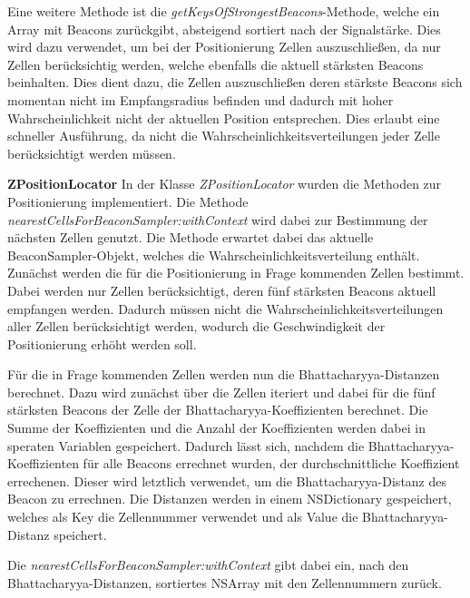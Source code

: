 Eine weitere Methode ist die \emph{getKeysOfStrongestBeacons}-Methode, welche ein Array mit Beacons zurückgibt, absteigend sortiert nach der Signalstärke. Dies wird dazu verwendet, um bei der Positionierung Zellen auszuschließen, da nur Zellen berücksichtig werden, welche ebenfalls die aktuell stärksten Beacons beinhalten. Dies dient dazu, die Zellen auszuschließen deren stärkste Beacons sich momentan nicht im Empfangsradius befinden und dadurch mit hoher Wahrscheinlichkeit nicht der aktuellen Position entsprechen. Dies erlaubt eine schneller Ausführung, da nicht die Wahrscheinlichkeitsverteilungen jeder Zelle berücksichtigt werden müssen.



\textbf{ZPositionLocator}
In der Klasse \emph{ZPositionLocator} wurden die Methoden zur Positionierung implementiert. Die Methode \emph{nearestCellsForBeaconSampler:withContext} wird dabei zur Bestimmung der nächsten Zellen genutzt. 
Die Methode erwartet dabei das aktuelle BeaconSampler-Objekt, welches die Wahrscheinlichkeitsverteilung enthält. 
Zunächst werden die für die Positionierung in Frage kommenden Zellen bestimmt. Dabei werden nur Zellen berücksichtigt, deren fünf stärksten Beacons aktuell empfangen werden. Dadurch müssen nicht die Wahrscheinlichkeitsverteilungen aller Zellen berücksichtigt werden, wodurch die Geschwindigkeit der Positionierung erhöht werden soll.

Für die in Frage kommenden Zellen werden nun die Bhattacharyya-Distanzen berechnet. Dazu wird zunächst über die Zellen iteriert und dabei für die fünf stärksten Beacons der Zelle der Bhattacharyya-Koeffizienten berechnet. Die Summe der Koeffizienten und die Anzahl der Koeffizienten werden dabei in  speraten Variablen gespeichert. Dadurch lässt sich, nachdem die Bhattacharyya-Koeffizienten für alle Beacons errechnet wurden, der durchschnittliche Koeffizient errechenen. Dieser wird letztlich verwendet, um die Bhattacharyya-Distanz des Beacon zu errechnen. Die Distanzen werden in einem NSDictionary gespeichert, welches als Key die Zellennummer verwendet und als Value die Bhattacharyya-Distanz speichert.

Die \emph{nearestCellsForBeaconSampler:withContext} gibt dabei ein, nach den Bhattacharyya-Distanzen, sortiertes NSArray mit den Zellennummern zurück. 




